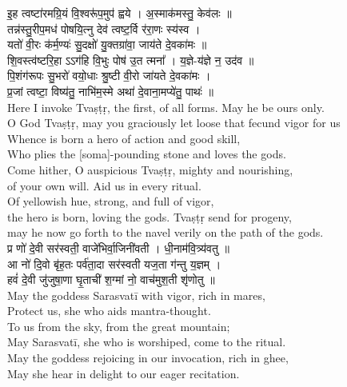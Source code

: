 \documentclass[11pt]{article}
\begin{document}
\begin{adjustwidth}{6em}{.2em}
{\large\skts\color{deepblue}
इ॒ह त्वष्टा॑रमग्रि॒यं वि॒श्वरू॑प॒मुप॑ ह्वये । अ॒स्माक॑मस्तु॒ केव॑लः ॥\\ 
तन्न॑स्तु॒रीप॒मध॑ पोषयि॒त्नु देव॑ त्वष्ट॒र्वि र॑रा॒णः स्य॑स्व ।\\
यतो॑ वी॒रः क॑र्म॒ण्यः॑ सु॒दक्षो॑ यु॒क्तग्रा॑वा॒ जाय॑ते दे॒वका॑मः ॥\\
शि॒वस्त्व॑ष्टरि॒हा ऽऽग॑हि वि॒भुः पोष॑ उ॒त त्मना᳚ । य॒ज्ञे-य॑ज्ञे न॒ उद॑व ॥\\
पि॒शंग॑रूपः सु॒भरो॑ वयो॒धाः श्रु॒ष्टी वी॒रो जा॑यते दे॒वका॑मः ।\\
प्र॒जां त्वष्टा॒ विष्य॑तु॒ नाभि॑म॒स्मे अथा॑ दे॒वाना॒मप्ये॑तु॒ पाथः॑ ॥}\\[5pt]
Here I invoke Tvaṣṭṛ, the first, of all forms. May he be ours only.\\
O God Tvaṣṭṛ, may you graciously let loose that fecund vigor for us \\
Whence is born a hero of action and good skill,\\
Who plies the [soma]-pounding stone and loves the gods.\\
Come hither, O auspicious Tvaṣṭṛ, mighty and nourishing,\\
of your own will. Aid us in every ritual.\\
Of yellowish hue, strong, and full of vigor,\\ 
the hero is born, loving the gods. Tvaṣṭṛ send for progeny,\\
may he now go forth to the navel verily on the path of the gods.\\[10pt]

{\large\skts\color{deepblue}
प्र णो॑ दे॒वी सर॑स्वती॒ वाजे॑भिर्वा॒जिनी॑वती । धी॒नाम॑वि॒त्र्य॑वतु ॥\\
आ नो॑ दि॒वो बृ॑ह॒तः पर्व॑ता॒दा सर॑स्वती यज॒ता ग॑न्तु य॒ज्ञम् ।\\
हवं॑ दे॒वी जु॑जुषा॒णा घृ॒ताची॑ श॒ग्मां नो॒ वाच॑मुश॒ती श‍ृ॑णोतु ॥}\\[5pt]
May the goddess Sarasvatī with vigor, rich in mares,\\
Protect us, she who aids mantra-thought.\\
To us from the sky, from the great mountain;\\
May Sarasvatī, she who is worshiped, come to the ritual.\\
May the goddess rejoicing in our invocation, rich in ghee,\\
May she hear in delight to our eager recitation.\\[10pt]


\end{adjustwidth}
\end{document}
